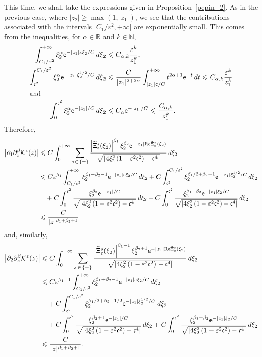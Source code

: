 \documentclass[10pt]{amsart}
\theoremstyle{definition}\newtheorem{defi}[theo]{Definition}\newtheorem{rema}[theo]{Remark}\newtheorem{exam}[theo]{Example}\newtheorem{exem}[theo]{Example}\newtheorem{nota}[theo]{Notation}
\newcommand*\p{\partial}
\newcommand*\R{\mathbb R}
\newcommand*\N{\mathbb N}
\newcommand{\Rel}{\mathrm{Re}}
\newcommand*\BK{\mathcal{K}}
\newcommand*\ex{{\sf e}}
\newcommand*\cs{{\mathfrak c}}
\newcommand*\ii{\infty}
\newcommand*\gs{\geqslant }
\newcommand*\ls{\leqslant }
\newcommand*\e{\varepsilon}
\renewcommand*\t{\tilde}
\let\oldtilde\tilde
\renewcommand*{\tilde}[1]{\mathchoice{\widetilde{#1}}{\widetilde{#1}}{\oldtilde{#1}}{\oldtilde{#1}}}
\begin{document}
This time, we shall take the expressions given in Proposition~\ref{pepin_2}. As in the previous case, where $ |z_2 | \gs \max(1, |z_1|) $, we see that the contributions associated with the intervals $ [C_1/ \e^2, +\ii [$ are exponentially small. This comes from the inequalities, for $ \alpha \in \R $ and $ k \in \N $,
\begin{align*}
\int_{C_1/\e^2 }^{+\ii} \xi_2^\alpha \ex^{- |z_1| \e \xi_2 / C} \, d\xi_2
&\ls C_{\alpha,k} \frac{\e^k}{z_1^k},
\\
\int_{\cs^2}^{C_1/\e^2 } \xi_2^\alpha \ex^{- |z_1| \xi_2^{1/2} / C} \, d\xi_2
&\ls \frac{C}{|z_1|^{2+2\alpha} } \int_{|z_1| \cs / C }^{+\ii} t^{2\alpha+1} \ex^{- t} \, dt
\ls C_{\alpha,k} \frac{\e^k}{z_1^k}
\\
\intertext{and}
\int_0^{\cs^2} \xi_2^\alpha \ex^{- |z_1| / C} \, d\xi_2
&\ls C_\alpha \ex^{- |z_1| / C}
\ls \frac{C_{\alpha,k} }{z_1^k}.
\end{align*}
Therefore,
\begin{align*}
\left\lvert \p_1 \p_z^\beta \BK^\e (z) \right\rvert &
\ls C \int_{0}^{+\ii} \sum_{s\,\in\,\{ \pm \} }
\frac{\left\lvert \t\Xi_\e^s (\xi_2) \right\rvert^{\beta_1} \xi_2^{\beta_2} \ex^{- |z_1| \Rel \t\Xi_\e^s (\xi_2) } }{ \sqrt{\left \lvert 4 \xi_2^2 \left(1 - \e^2 \cs^2\right) - \cs^4\right\rvert}} \, d\xi_2
\\ &
\ls C \e^{\beta_1} \int_{ C_1 /\e^2 }^{+\ii} \xi_2^{\beta_1 + \beta_2 - 1} \ex^{- |z_1| \e \xi_2 / C} \, d \xi_2 + C \int_{\cs^2}^{ C_1 /\e^2 } \xi_2^{\beta_1 /2 + \beta_2 - 1} \ex^{- |z_1| \xi_2^{1/2} / C} \, d \xi_2
\\ & \quad + C \int_0^{\cs^2} \frac{ \xi_2^{\beta_2} \ex^{- |z_1| / C} }{ \sqrt{ \left\lvert 4 \xi_2^2 \left(1 - \e^2 \cs^2\right) - \cs^4\right\rvert } } \, d\xi_2 + C \int_0^{\cs^2} \frac{ \xi_2^{\beta_1 + \beta_2} \ex^{- |z_1| \xi_2 / C} }{ \sqrt{ \left\lvert 4 \xi_2^2\left(1 - \e^2 \cs^2\right) - \cs^4\right\rvert } } \, d\xi_2
\\ & \ls
\frac{C}{|z|^{\beta_1+\beta_2 +1} }
\end{align*}
and, similarly,
\begin{align*}
\left\lvert \p_2 \p_z^\beta \BK^\e (z)\right\rvert &
\ls C \int_{0}^{+\ii} \sum_{s\,\in\,\{ \pm \} }
\frac{\left\lvert \t\Xi_\e^s (\xi_2) \right\rvert^{\beta_1-1} \xi_2^{\beta_2+1} \ex^{- |z_1| \Rel \t\Xi_\e^s (\xi_2) } }{ \sqrt{ \left\lvert 4 \xi_2^2 \left(1 - \e^2 \cs^2\right) - \cs^4\right\rvert } } \, d\xi_2
\\ &
\ls C \e^{\beta_1-1} \int_{ C_1 /\e^2 }^{+\ii} \xi_2^{\beta_1 + \beta_2 - 1} \ex^{- |z_1| \e \xi_2 / C} \, d \xi_2
\\ & \quad + C \int_{\cs^2}^{ C_1 /\e^2 } \xi_2^{\beta_1 /2 + \beta_2 - 1/2} \ex^{- |z_1| \xi_2^{1/2} / C} \, d \xi_2
\\ & \quad + C \int_0^{\cs^2} \frac{ \xi_2^{\beta_2+1} \ex^{- |z_1| / C} }{ \sqrt{ \left\lvert 4 \xi_2^2 \left(1 - \e^2 \cs^2\right) - \cs^4\right\rvert } } \, d\xi_2 + C \int_0^{\cs^2} \frac{ \xi_2^{\beta_1 + \beta_2} \ex^{- |z_1| \xi_2 / C} }{ \sqrt{ \left\lvert 4 \xi_2^2\left(1 - \e^2 \cs^2\right) - \cs^4 \right\rvert } } \, d\xi_2
\\ & \ls
\frac{C}{|z|^{\beta_1+\beta_2 +1} }.
\end{align*}
\end{document}
